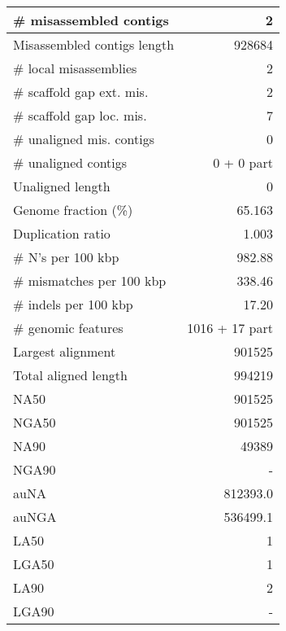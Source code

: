 \documentclass[12pt,a4paper]{article}
\begin{document}
\begin{table}[ht]
\begin{center}
\begin{tabular}{|l*{1}{|r}|}
\# misassembled contigs & 2 \\ \hline
Misassembled contigs length & 928684 \\ \hline
\# local misassemblies & 2 \\ \hline
\# scaffold gap ext. mis. & 2 \\ \hline
\# scaffold gap loc. mis. & 7 \\ \hline
\# unaligned mis. contigs & 0 \\ \hline
\# unaligned contigs & 0 + 0 part \\ \hline
Unaligned length & 0 \\ \hline
Genome fraction (\%) & 65.163 \\ \hline
Duplication ratio & 1.003 \\ \hline
\# N's per 100 kbp & 982.88 \\ \hline
\# mismatches per 100 kbp & 338.46 \\ \hline
\# indels per 100 kbp & 17.20 \\ \hline
\# genomic features & 1016 + 17 part \\ \hline
Largest alignment & 901525 \\ \hline
Total aligned length & 994219 \\ \hline
NA50 & 901525 \\ \hline
NGA50 & 901525 \\ \hline
NA90 & 49389 \\ \hline
NGA90 & - \\ \hline
auNA & 812393.0 \\ \hline
auNGA & 536499.1 \\ \hline
LA50 & 1 \\ \hline
LGA50 & 1 \\ \hline
LA90 & 2 \\ \hline
LGA90 & - \\ \hline
\end{tabular}
\end{center}
\end{table}
\end{document}
